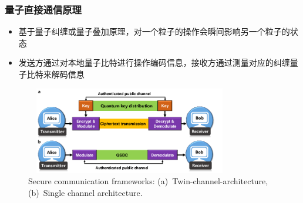 \begin{frame}
    \frametitle{量子直接通信原理}
    \begin{itemize}
        \item 基于量子纠缠或量子叠加原理，对一个粒子的操作会瞬间影响另一个粒子的状态\\
		{\fontsize{7.5pt}{5.2pt}\selectfont{利用纠缠态的量子比特，实现信息的直接传输}}
        \item 发送方通过对本地量子比特进行操作编码信息，接收方通过测量对应的纠缠量子比特来解码信息
    \end{itemize}
    \begin{figure}
        \centering
                \includegraphics[height=1.5in, width=3.6in, viewport=0 0 250 112,clip]{Figures/Secure-communication-frameworks_Twin-channel-architecture_Single-channel-architecture.png}
		\caption{\tiny{\textrm{Secure communication frameworks: (a)~Twin-channel-architecture, (b)~Single channel architecture.}}}%
		\label{Fig:Secure-communication-frameworks_Twin-channel-architecture_Single-channel-architecture}
    \end{figure}
\end{frame}

